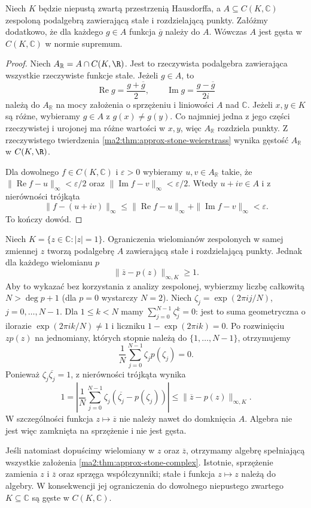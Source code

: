 \begin{twierdzenie}
\label{ma2:thm:approx-stone-complex}
Niech $K$ będzie niepustą zwartą przestrzenią
Hausdorffa, a $A\subseteq C(K,\mathbb C)$
zespoloną podalgebrą zawierającą stałe
i rozdzielającą punkty. Załóżmy dodatkowo,
że dla każdego $g\in A$ funkcja $\overline g$
należy do $A$. Wówczas $A$ jest gęsta
w $C(K,\mathbb C)$ w normie supremum.
\end{twierdzenie}
\begin{proof}
Niech $A_{\mathbb R}=A\cap C(K,\R)$.
Jest to rzeczywista podalgebra zawierająca
wszystkie rzeczywiste funkcje stałe.
Jeżeli $g\in A$, to
\[
 \operatorname{Re}g=\frac{g+\overline g}{2},
 \qquad
 \operatorname{Im}g=\frac{g-\overline g}{2i}
\]
należą do $A_{\mathbb R}$ na mocy
założenia o sprzężeniu i liniowości $A$
nad $\mathbb C$.
Jeżeli $x,y\in K$ są różne, wybieramy
$g\in A$ z $g(x)\ne g(y)$.
Co najmniej jedna z jego części rzeczywistej
i urojonej ma różne wartości w $x,y$,
więc $A_{\mathbb R}$ rozdziela punkty.
Z rzeczywistego twierdzenia
\ref{ma2:thm:approx-stone-weierstrass}
wynika gęstość $A_{\mathbb R}$ w $C(K,\R)$.

Dla dowolnego $f\in C(K,\mathbb C)$
i $\varepsilon>0$ wybieramy $u,v\in A_{\mathbb R}$
takie, że
$\|\operatorname{Re}f-u\|_\infty<\varepsilon/2$
oraz $\|\operatorname{Im}f-v\|_\infty<\varepsilon/2$.
Wtedy $u+iv\in A$ i z nierówności trójkąta
\[
 \|f-(u+iv)\|_\infty
 \le\|\operatorname{Re}f-u\|_\infty
    +\|\operatorname{Im}f-v\|_\infty<\varepsilon.
\]
To kończy dowód.
\end{proof}

\begin{przyklad}
\label{ma2:ex:approx-stone-no-conjugation}
Niech $K=\{z\in\mathbb C:|z|=1\}$.
Ograniczenia wielomianów zespolonych w samej
zmiennej $z$ tworzą podalgebrę $A$
zawierającą stałe i rozdzielającą punkty.
Jednak dla każdego wielomianu $p$
\[
 \|\overline z-p(z)\|_{\infty,K}\ge1.
\]
Aby to wykazać bez korzystania z analizy
zespolonej, wybierzmy liczbę całkowitą
$N>\deg p+1$ (dla $p=0$ wystarczy $N=2$).
Niech $\zeta_j=\exp(2\pi i j/N)$,
$j=0,\ldots,N-1$.
Dla $1\le k<N$ mamy
$\sum_{j=0}^{N-1}\zeta_j^k=0$:
jest to suma geometryczna o ilorazie
$\exp(2\pi i k/N)\ne1$ i liczniku
$1-\exp(2\pi i k)=0$.
Po rozwinięciu $zp(z)$ na jednomiany,
których stopnie należą do $\{1,\ldots,N-1\}$,
otrzymujemy
\[
 \frac1N\sum_{j=0}^{N-1}\zeta_jp(\zeta_j)=0.
\]
Ponieważ $\zeta_j\overline{\zeta_j}=1$,
z nierówności trójkąta wynika
\[
 1=\left|\frac1N\sum_{j=0}^{N-1}
 \zeta_j(\overline{\zeta_j}-p(\zeta_j))\right|
 \le\|\overline z-p(z)\|_{\infty,K}.
\]
W szczególności funkcja $z\mapsto\overline z$
nie należy nawet do domknięcia $A$.
Algebra nie jest więc zamknięta na sprzężenie
i nie jest gęsta.

Jeśli natomiast dopuścimy wielomiany w $z$
oraz $\overline z$, otrzymamy algebrę
spełniającą wszystkie założenia
\ref{ma2:thm:approx-stone-complex}.
Istotnie, sprzężenie zamienia $z$ i $\overline z$
oraz sprzęga współczynniki; stałe i funkcja
$z\mapsto z$ należą do algebry.
W konsekwencji jej ograniczenia do dowolnego
niepustego zwartego $K\subseteq\mathbb C$
są gęste w $C(K,\mathbb C)$.
\end{przyklad}

